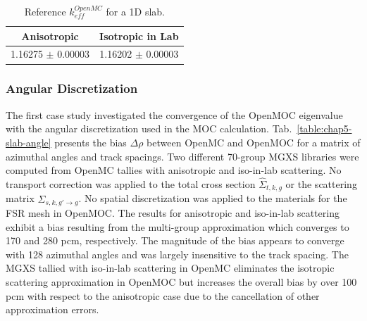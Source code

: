 \begin{table}[h!]
  \centering
  \caption[Reference $k^{OpenMC}_{eff}$ for a 1D slab]{Reference $k^{OpenMC}_{eff}$ for a 1D slab.}
  \small
  \label{table:chap5-slab-reference} 
  \vspace{6pt}
  \begin{tabular}{c c}
  \toprule
  \rowcolor{lightgray}
  {\cellcolor{carolinablue} {\bf Anisotropic}} &
  {\cellcolor{lightgreen} {\bf Isotropic in Lab}} \\
  \midrule
  1.16275 $\pm$ 0.00003 & 1.16202 $\pm$ 0.00003 \\
  \bottomrule
\end{tabular}
\end{table}

\subsubsection{Angular Discretization}
\label{subsubsec:chap5-slab-angle}

The first case study investigated the convergence of the OpenMOC eigenvalue with the angular discretization used in the \ac{MOC} calculation. Tab.~\ref{table:chap5-slab-angle} presents the bias $\Delta\rho$ between OpenMC and OpenMOC for a matrix of azimuthal angles and track spacings. Two different 70-group \ac{MGXS} libraries were computed from OpenMC tallies with anisotropic and iso-in-lab scattering. No transport correction was applied to the total cross section $\hat{\Sigma}_{t,k,g}$ or the scattering matrix $\hat{\Sigma}_{s,k,g'\rightarrow g}$. No spatial discretization was applied to the materials for the \ac{FSR} mesh in OpenMOC. The results for anisotropic and iso-in-lab scattering exhibit a bias resulting from the multi-group approximation which converges to 170 and 280 pcm, respectively. The magnitude of the bias appears to converge with 128 azimuthal angles and was largely insensitive to the track spacing. The \ac{MGXS} tallied with iso-in-lab scattering in OpenMC eliminates the isotropic scattering approximation in OpenMOC but increases the overall bias by over 100 \ac{pcm} with respect to the anisotropic case due to the cancellation of other approximation errors.

